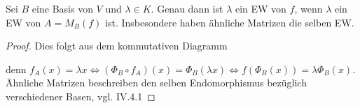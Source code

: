 \begin{proposition}
	Sei $B$ eine Basis von $V$ und $\lambda\in K$. Genau dann ist $\lambda$ ein EW von $f$, wenn $\lambda$ ein EW von $A=M_B(f)$ ist. Insbesondere haben ähnliche Matrizen die selben EW.
\end{proposition}
\begin{proof}
	Dies folgt aus dem kommutativen Diagramm
	\begin{center}\end{center}
	denn $f_A(x)=\lambda x\iff (\Phi_B\circ f_A)(x)=\Phi_B(\lambda x)\iff f(\Phi_B(x))=\lambda\Phi_B(x)$. \\
	Ähnliche Matrizen beschreiben den selben Endomorphismus bezüglich verschiedener Basen, vgl. IV.4.1 %
\end{proof}